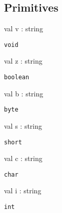 \documentclass[11pt]{article}
\begin{document}
\ocamldocvspace{0.5cm}



\subsection{Primitives}




\label{val:Java.v}\begin{ocamldoccode}
val v : string
\end{ocamldoccode}
\begin{ocamldocdescription}
{\tt{void}}


\end{ocamldocdescription}




\label{val:Java.z}\begin{ocamldoccode}
val z : string
\end{ocamldoccode}
\begin{ocamldocdescription}
{\tt{boolean}}


\end{ocamldocdescription}




\label{val:Java.b}\begin{ocamldoccode}
val b : string
\end{ocamldoccode}
\begin{ocamldocdescription}
{\tt{byte}}


\end{ocamldocdescription}




\label{val:Java.s}\begin{ocamldoccode}
val s : string
\end{ocamldoccode}
\begin{ocamldocdescription}
{\tt{short}}


\end{ocamldocdescription}




\label{val:Java.c}\begin{ocamldoccode}
val c : string
\end{ocamldoccode}
\begin{ocamldocdescription}
{\tt{char}}


\end{ocamldocdescription}




\label{val:Java.i}\begin{ocamldoccode}
val i : string
\end{ocamldoccode}
\begin{ocamldocdescription}
{\tt{int}}


\end{ocamldocdescription}
\end{document}
